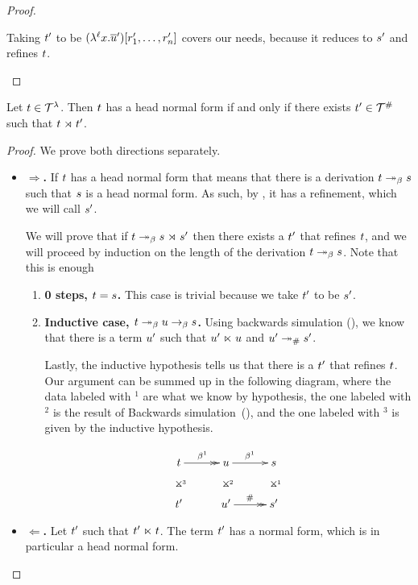 \begin{proof}
\begin{enumerate}
\begin{enumerate}
      Taking $t'$ to be $(\lambda^{\ell} x. \overline{u}')[r'_1, \hdots, r'_n]$
      covers our needs, because it reduces to $s'$ and refines $t$.
  \end{enumerate}
\end{enumerate}
\end{proof}

\bigskip

Let $t \in \mathcal{T}^{\lambda}$.
Then $t$ has a head normal form if and only if there exists $t' \in \mathcal{T}^{\mathtt{\#}}$ such that $t \mathrel{\rtimes} t'$.

\begin{proof} We prove both directions separately.
\begin{itemize}
  \item[] {\bf $\Rightarrow$.} If $t$ has a head normal form that means that there is a derivation $t \mathrel{\twoheadrightarrow_\beta} s$ such that $s$ is a head normal form.
    As such, by , it has a refinement, which we will call $s'$.

    We will prove that if $t \mathrel{\twoheadrightarrow_\beta} s \mathrel{\rtimes} s'$ then
    there exists a $t'$ that refines $t$, and we will proceed by
    induction on the length of the derivation $t \mathrel{\twoheadrightarrow_\beta} s$.
    Note that this is enough
    \begin{enumerate}
      \item {\bf 0 steps, $t = s$.} This case is trivial because we take $t'$ to be $s'$.
      \item {\bf Inductive case, $t \mathrel{\twoheadrightarrow_\beta} u \mathrel{\to_\beta} s$.}
        Using backwards simulation (), we know that
        there is a term $u'$ such that $u' \mathrel{\ltimes} u$ and $u' \mathrel{\twoheadrightarrow}_{\mathtt{\#}} s'$.

        Lastly, the inductive hypothesis tells us that there is a $t'$ that refines $t$.
        Our argument can be summed up in the following diagram,
        where the data labeled with $^1$ are what we know by hypothesis,
        the one labeled with $^2$ is the result of Backwards simulation~(),
        and the one labeled with $^3$ is given by the inductive hypothesis.

        \[
        \xymatrix@C=1cm{
          \tm  \ar@{}[d]|*=0[@]{\rtimes}^{^3} \ar@{->>}[r]^{\beta^1}
            & \tmthree \ar@{}[d]|*=0[@]{\rtimes}^{^2} \ar[r]^{\beta^1}
            & \tmtwo \ar@{}[d]|*=0[@]{\rtimes}^{^1}  \\
          \tm' & \tmthree' \ar@{->>}[r]^{\dist} & \tmtwo' \\
        }
        \]
    \end{enumerate}
  \item[] {\bf $\Leftarrow$.} Let $t'$ such that $t' \mathrel{\ltimes} t$.
    The term $t'$ has a normal form, which is in particular a head normal form.


\end{itemize}
\end{proof}
